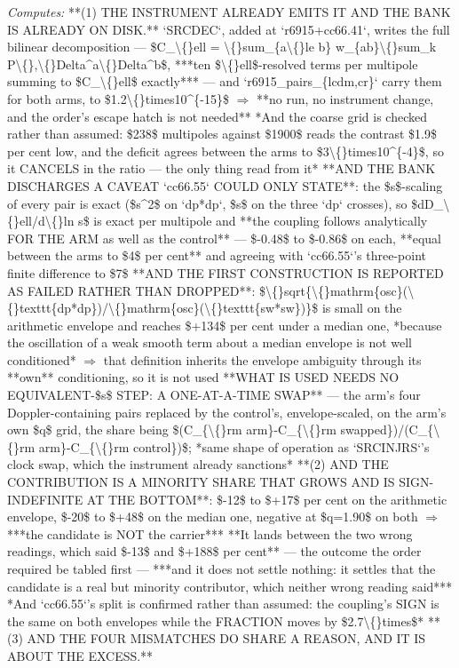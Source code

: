 \begin{description}
\emph{Computes:}  **(1) THE INSTRUMENT ALREADY EMITS IT AND THE BANK IS ALREADY ON DISK.** `SRCDEC`, added at `r6915+cc66.41`, writes the full bilinear decomposition --- \$C\_\textbackslash\{\}ell = \textbackslash\{\}sum\_\{a\textbackslash\{\}le b\} w\_\{ab\}\textbackslash\{\}sum\_k P\textbackslash\{\},\textbackslash\{\}Delta\textasciicircum{}a\textbackslash\{\}Delta\textasciicircum{}b\$, ***ten \$\textbackslash\{\}ell\$-resolved terms per multipole summing to \$C\_\textbackslash\{\}ell\$ exactly*** --- and `r6915\_pairs\_\{lcdm,cr\}` carry them for both arms, to \$1.2\textbackslash\{\}times10\textasciicircum{}\{-15\}\$ \ensuremath{\Rightarrow} **no run, no instrument change, and the order's escape hatch is not needed**  *And the coarse grid is checked rather than assumed: \$238\$ multipoles against \$1900\$ reads the contrast \$1.9\$ per cent low, and the deficit agrees between the arms to \$3\textbackslash\{\}times10\textasciicircum{}\{-4\}\$, so it CANCELS in the ratio --- the only thing read from it*   **AND THE BANK DISCHARGES A CAVEAT `cc66.55` COULD ONLY STATE**: the \$s\$-scaling of every pair is exact (\$s\textasciicircum{}2\$ on `dp*dp`, \$s\$ on the three `dp` crosses), so \$dD\_\textbackslash\{\}ell/d\textbackslash\{\}ln s\$ is exact per multipole and **the coupling follows analytically FOR THE ARM as well as the control** --- \$-0.48\$ to \$-0.86\$ on each, **equal between the arms to \$4\$ per cent** and agreeing with `cc66.55`'s three-point finite difference to \$7\$   **AND THE FIRST CONSTRUCTION IS REPORTED AS FAILED RATHER THAN DROPPED**: \$\textbackslash\{\}sqrt\{\textbackslash\{\}mathrm\{osc\}(\textbackslash\{\}texttt\{dp*dp\})/\textbackslash\{\}mathrm\{osc\}(\textbackslash\{\}texttt\{sw*sw\})\}\$ is small on the arithmetic envelope and reaches \$+134\$ per cent under a median one, *because the oscillation of a weak smooth term about a median envelope is not well conditioned* \ensuremath{\Rightarrow} that definition inherits the envelope ambiguity through its **own** conditioning, so it is not used   **WHAT IS USED NEEDS NO EQUIVALENT-\$s\$ STEP: A ONE-AT-A-TIME SWAP** --- the arm's four Doppler-containing pairs replaced by the control's, envelope-scaled, on the arm's own \$q\$ grid, the share being \$(C\_\{\textbackslash\{\}rm arm\}-C\_\{\textbackslash\{\}rm swapped\})/(C\_\{\textbackslash\{\}rm arm\}-C\_\{\textbackslash\{\}rm control\})\$; *same shape of operation as `SRCINJRS`'s clock swap, which the instrument already sanctions*   **(2) AND THE CONTRIBUTION IS A MINORITY SHARE THAT GROWS AND IS SIGN-INDEFINITE AT THE BOTTOM**: \$-12\$ to \$+17\$ per cent on the arithmetic envelope, \$-20\$ to \$+48\$ on the median one, negative at \$q=1.90\$ on both \ensuremath{\Rightarrow} ***the candidate is NOT the carrier***  **It lands between the two wrong readings, which said \$-13\$ and \$+188\$ per cent** --- the outcome the order required be tabled first --- ***and it does not settle nothing: it settles that the candidate is a real but minority contributor, which neither wrong reading said***  *And `cc66.55`'s split is confirmed rather than assumed: the coupling's SIGN is the same on both envelopes while the FRACTION moves by \$2.7\textbackslash\{\}times\$*   **(3) AND THE FOUR MISMATCHES DO SHARE A REASON, AND IT IS ABOUT THE EXCESS.** 
\end{description}
